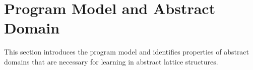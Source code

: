 \section{Program Model and Abstract Domain}\label{sec:domains}
This section introduces the program model and identifies properties of abstract
domains that are necessary for learning in abstract lattice structures.

